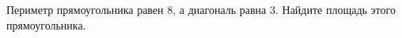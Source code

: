 \begin{ex}
	\begin{condition}
		Периметр прямоугольника равен \( 8 \), а диагональ равна \( 3 \). Найдите площадь этого прямоугольника.
	\end{condition}
\end{ex}
